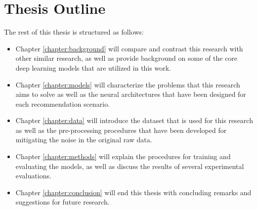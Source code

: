
\section{Thesis Outline}
\label{section:structure}
The rest of this thesis is structured as follows:

\begin{itemize}
	\item Chapter \ref{chapter:background} will compare and contrast this research with other similar research, as well as provide background on some of the core deep learning models that are utilized in this work.
	\item Chapter \ref{chapter:models} will characterize the problems that this research aims to solve as well as the neural architectures that have been designed for each recommendation scenario.
	\item Chapter \ref{chapter:data} will introduce the dataset that is used for this research as well as the pre-processing procedures that have been developed for mitigating the noise in the original raw data.
	\item Chapter \ref{chapter:methods} will explain the procedures for training and evaluating the models, as well as discuss the results of several experimental evaluations.
	\item Chapter \ref{chapter:conclusion} will end this thesis with concluding remarks and suggestions for future research.
\end{itemize}
